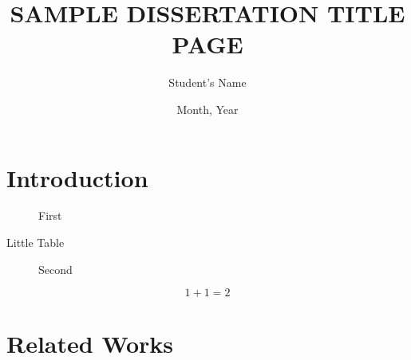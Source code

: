 \documentclass{unophd}
\title{SAMPLE DISSERTATION TITLE PAGE}
\author{Student's Name}
\date{Month, Year}
\begin{document}
\maketitle

\makeabstract

\tableofcontents


\listoffigtab

\listofmyequations

\chapter{Introduction}


\begin{figure}[!b]
	\caption{First}
\end{figure}

\begin{table}[!b]
	\caption{Little Table}
\end{table}

\begin{figure}[!b]
	\caption{Second}
\end{figure}

\begin{equation}
1 + 1 = 2
\end{equation}
\label{eq:2.1}



\chapter{Related Works}
\end{document}
